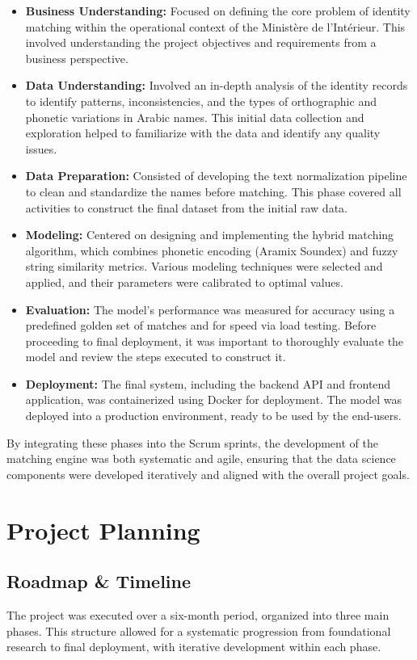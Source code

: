 \begin{itemize}
    \item \textbf{Business Understanding:} Focused on defining the core problem of identity matching within the operational context of the Ministère de l'Intérieur. This involved understanding the project objectives and requirements from a business perspective.
    \item \textbf{Data Understanding:} Involved an in-depth analysis of the identity records to identify patterns, inconsistencies, and the types of orthographic and phonetic variations in Arabic names. This initial data collection and exploration helped to familiarize with the data and identify any quality issues.
    \item \textbf{Data Preparation:} Consisted of developing the text normalization pipeline to clean and standardize the names before matching. This phase covered all activities to construct the final dataset from the initial raw data.
    \item \textbf{Modeling:} Centered on designing and implementing the hybrid matching algorithm, which combines phonetic encoding (Aramix Soundex) and fuzzy string similarity metrics. Various modeling techniques were selected and applied, and their parameters were calibrated to optimal values.
    \item \textbf{Evaluation:} The model's performance was measured for accuracy using a predefined golden set of matches and for speed via load testing. Before proceeding to final deployment, it was important to thoroughly evaluate the model and review the steps executed to construct it.
    \item \textbf{Deployment:} The final system, including the backend API and frontend application, was containerized using Docker for deployment. The model was deployed into a production environment, ready to be used by the end-users.
\end{itemize}
By integrating these phases into the Scrum sprints, the development of the matching engine was both systematic and agile, ensuring that the data science components were developed iteratively and aligned with the overall project goals.

\section{Project Planning}
\subsection{Roadmap \& Timeline}
The project was executed over a six-month period, organized into three main phases. This structure allowed for a systematic progression from foundational research to final deployment, with iterative development within each phase.

